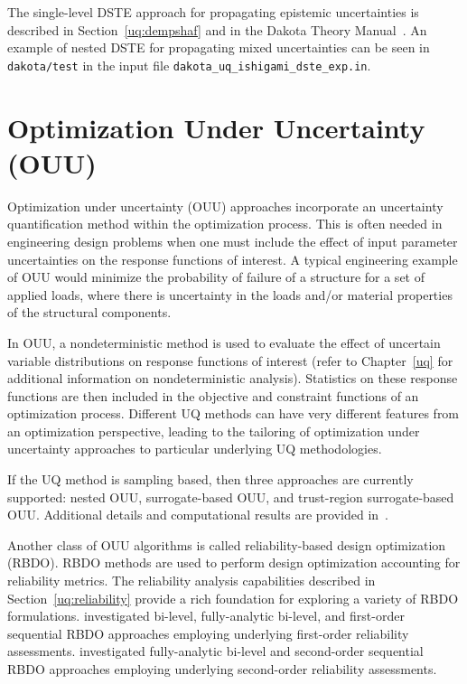 The single-level DSTE approach for propagating epistemic uncertainties
is described in Section~\ref{uq:dempshaf} and in the Dakota Theory
Manual~\cite{TheoMan}. An example of nested DSTE for propagating mixed
uncertainties can be seen in \texttt{dakota/test} in the input file
\texttt{dakota\_uq\_ishigami\_dste\_exp.in}.


\section{Optimization Under Uncertainty (OUU)} \label{adv_models:ouu}

Optimization under uncertainty (OUU) approaches incorporate an
uncertainty quantification method within the optimization
process. This is often needed in engineering design problems when one
must include the effect of input parameter uncertainties on the
response functions of interest. A typical engineering example of OUU
would minimize the probability of failure of a structure for a set of
applied loads, where there is uncertainty in the loads and/or material
properties of the structural components.

In OUU, a nondeterministic method is used to evaluate the effect of
uncertain variable distributions on response functions of interest
(refer to Chapter~\ref{uq} for additional information on
nondeterministic analysis). Statistics on these response functions are
then included in the objective and constraint functions of an
optimization process. Different UQ methods can have very different
features from an optimization perspective, leading to the tailoring of
optimization under uncertainty approaches to particular underlying UQ
methodologies.

If the UQ method is sampling based, then three approaches are
currently supported: nested OUU, surrogate-based OUU, and trust-region
surrogate-based OUU. Additional details and computational results are
provided in~\cite{Eld02}.

Another class of OUU algorithms is called reliability-based design
optimization (RBDO). RBDO methods are used to perform design
optimization accounting for reliability metrics. The reliability
analysis capabilities described in Section~\ref{uq:reliability}
provide a rich foundation for exploring a variety of RBDO
formulations. \cite{Eld05} investigated bi-level, fully-analytic
bi-level, and first-order sequential RBDO approaches employing
underlying first-order reliability assessments.
\cite{Eld06a} investigated fully-analytic bi-level and 
second-order sequential RBDO approaches employing underlying
second-order reliability assessments. 

